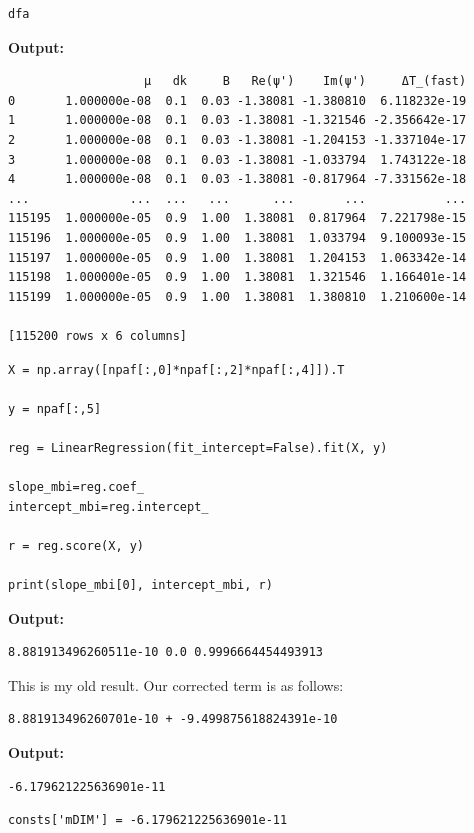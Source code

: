 \documentclass{article}
\begin{document}
\begin{lstlisting}
dfa\end{lstlisting}

\textbf{Output:}\begin{verbatim}
                   μ   dk     B   Re(ψ')    Im(ψ')     ΔT_(fast)
0       1.000000e-08  0.1  0.03 -1.38081 -1.380810  6.118232e-19
1       1.000000e-08  0.1  0.03 -1.38081 -1.321546 -2.356642e-17
2       1.000000e-08  0.1  0.03 -1.38081 -1.204153 -1.337104e-17
3       1.000000e-08  0.1  0.03 -1.38081 -1.033794  1.743122e-18
4       1.000000e-08  0.1  0.03 -1.38081 -0.817964 -7.331562e-18
...              ...  ...   ...      ...       ...           ...
115195  1.000000e-05  0.9  1.00  1.38081  0.817964  7.221798e-15
115196  1.000000e-05  0.9  1.00  1.38081  1.033794  9.100093e-15
115197  1.000000e-05  0.9  1.00  1.38081  1.204153  1.063342e-14
115198  1.000000e-05  0.9  1.00  1.38081  1.321546  1.166401e-14
115199  1.000000e-05  0.9  1.00  1.38081  1.380810  1.210600e-14

[115200 rows x 6 columns]
\end{verbatim}

\begin{lstlisting}
X = np.array([npaf[:,0]*npaf[:,2]*npaf[:,4]]).T

y = npaf[:,5]

reg = LinearRegression(fit_intercept=False).fit(X, y)

slope_mbi=reg.coef_
intercept_mbi=reg.intercept_

r = reg.score(X, y)

print(slope_mbi[0], intercept_mbi, r)\end{lstlisting}

\textbf{Output:}\begin{verbatim}
8.881913496260511e-10 0.0 0.9996664454493913

\end{verbatim}

This is my old result. Our corrected term is as follows:

\begin{lstlisting}
8.881913496260701e-10 + -9.499875618824391e-10\end{lstlisting}

\textbf{Output:}\begin{verbatim}
-6.179621225636901e-11
\end{verbatim}

\begin{lstlisting}
consts['mDIM'] = -6.179621225636901e-11\end{lstlisting}
\end{document}
